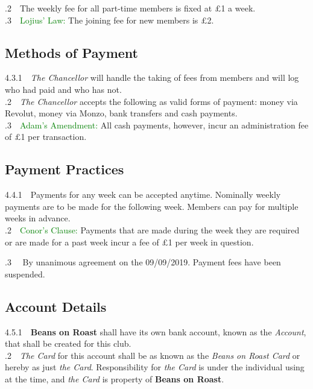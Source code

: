 \documentclass[a4paper,11pt]{article}
\begin{document}
.2$\quad$The weekly fee for all part-time members is fixed at $\pounds$1 a week.\\

.3$\quad$\textcolor{green}{Lojius' Law:} The joining fee for new members is $\pounds$2.

\subsection{Methods of Payment}
4.3.1$\quad$\textit{The Chancellor} will handle the taking of fees from members and will log who had paid and who has not.\\

.2$\quad$\textit{The Chancellor} accepts the following as valid forms of payment: money via Revolut, money via Monzo, bank transfers and cash payments.\\

.3$\quad$\textcolor{green}{Adam's Amendment:} All cash payments, however, incur an administration fee of $\pounds$1 per transaction.


\subsection{Payment Practices}
4.4.1$\quad$Payments for any week can be accepted anytime. Nominally weekly payments are to be made for the following week. Members can pay for multiple weeks in advance. \\

.2$\quad$\textcolor{green}{Conor's Clause:} Payments that are made during the week they are required or are made for a past week incur a fee of $\pounds$1 per week in question. 

.3$\quad$ By unanimous agreement on the 09/09/2019. Payment fees have been suspended.  

\subsection{Account Details}
4.5.1$\quad$\textbf{Beans on Roast} shall have its own bank account, known as the \textit{Account}, that shall be created for this club. \\

.2$\quad$\textit{The Card} for this account shall be as known as the \textit{Beans on Roast Card} or hereby as just \textit{the Card}. Responsibility for \textit{the Card} is under the individual using at the time, and \textit{the Card} is property of \textbf{Beans on Roast}.\\
\end{document}
